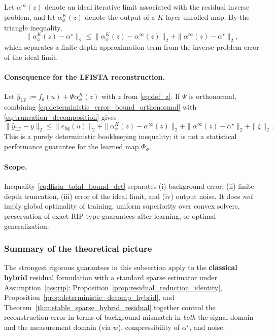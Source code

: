 Let $\alpha^\infty(z)$ denote an ideal iterative limit associated with the residual inverse problem, and let $\alpha_\phi^K(z)$ denote the output of a $K$-layer unrolled map.
By the triangle inequality,
\begin{equation}
  \|\alpha_\phi^K(z)-\alpha^\star\|_2
  \le
  \|\alpha_\phi^K(z)-\alpha^\infty(z)\|_2
  +
  \|\alpha^\infty(z)-\alpha^\star\|_2,
  \label{eq:truncation_decomposition}
\end{equation}
which separates a finite-depth approximation term from the inverse-problem error of the ideal limit.

\paragraph{Consequence for the LFISTA reconstruction.}
Let $\widehat{y}_{\mathrm{LF}}:=f_\theta(u)+\Psi\alpha_\phi^K(z)$ with $z$ from \eqref{eq:def_z}.
If $\Psi$ is orthonormal, combining \eqref{eq:deterministic_error_bound_orthonormal} with \eqref{eq:truncation_decomposition} gives
\begin{equation}
  \|\widehat{y}_{\mathrm{LF}}-y\|_2
  \le
  \|e_{\mathrm{bg}}(u)\|_2
  +
  \|\alpha_\phi^K(z)-\alpha^\infty(z)\|_2
  +
  \|\alpha^\infty(z)-\alpha^\star\|_2
  +
  \|\xi\|_2.
  \label{eq:lfista_total_bound_det}
\end{equation}
This is a purely deterministic bookkeeping inequality; it is not a statistical performance guarantee for the learned map $\Phi_\phi$.

\paragraph{Scope.}
Inequality \eqref{eq:lfista_total_bound_det} separates (i) background error, (ii) finite-depth truncation, (iii) error of the ideal limit, and (iv) output noise.
It does \emph{not} imply global optimality of training, uniform superiority over convex solvers, preservation of exact RIP-type guarantees after learning, or optimal generalization.

\subsubsection{Summary of the theoretical picture}

The strongest rigorous guarantees in this subsection apply to the \textbf{classical hybrid} residual formulation with a standard sparse estimator under Assumption~\ref{ass:rip}:
Proposition~\ref{prop:residual_reduction_identity}, Proposition~\ref{prop:deterministic_decomp_hybrid}, and Theorem~\ref{thm:stable_sparse_hybrid_residual} together control the reconstruction error in terms of background mismatch in \emph{both} the signal domain and the measurement domain (via $w$), compressibility of $\alpha^\star$, and noise.

